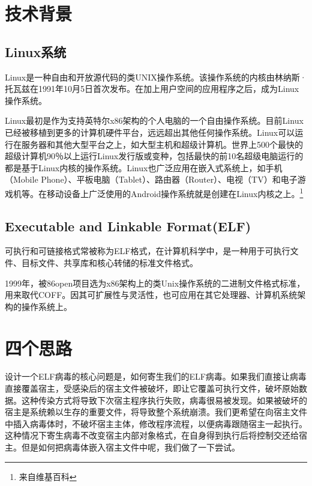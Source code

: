 \documentclass[a4paper, 11pt]{article}
\begin{document}
\section{技术背景}
\subsection{Linux系统}
Linux是一种自由和开放源代码的类UNIX操作系统。该操作系统的内核由林纳斯·托瓦兹在1991年10月5日首次发布。在加上用户空间的应用程序之后，成为Linux操作系统。

Linux最初是作为支持英特尔x86架构的个人电脑的一个自由操作系统。目前Linux已经被移植到更多的计算机硬件平台，远远超出其他任何操作系统。Linux可以运行在服务器和其他大型平台之上，如大型主机和超级计算机。世界上500个最快的超级计算机90％以上运行Linux发行版或变种，包括最快的前10名超级电脑运行的都是基于Linux内核的操作系统。Linux也广泛应用在嵌入式系统上，如手机（Mobile Phone）、平板电脑（Tablet）、路由器（Router）、电视（TV）和电子游戏机等。在移动设备上广泛使用的Android操作系统就是创建在Linux内核之上。\footnote{来自维基百科}
\subsection{Executable and Linkable Format(ELF)}
可执行和可链接格式常被称为ELF格式，在计算机科学中，是一种用于可执行文件、目标文件、共享库和核心转储的标准文件格式。

1999年，被86open项目选为x86架构上的类Unix操作系统的二进制文件格式标准，用来取代COFF。因其可扩展性与灵活性，也可应用在其它处理器、计算机系统架构的操作系统上。
\section{四个思路}
设计一个ELF病毒的核心问题是，如何寄生我们的ELF病毒。如果我们直接让病毒直接覆盖宿主，受感染后的宿主文件被破坏，即让它覆盖可执行文件，破坏原始数据。这种传染方式将导致下次宿主程序执行失败，病毒很易被发现。如果被破坏的宿主是系统赖以生存的重要文件，将导致整个系统崩溃。我们更希望在向宿主文件中插入病毒体时，不破坏宿主主体，修改程序流程，以便病毒跟随宿主一起执行。这种情况下寄生病毒不改变宿主内部对象格式，在自身得到执行后将控制交还给宿主。但是如何把病毒体嵌入宿主文件中呢，我们做了一下尝试。
\end{document}
